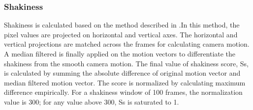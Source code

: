 \documentclass{IEEEtran}
\begin{document}
\subsubsection{Shakiness}
Shakiness is calculated based on the method described in \cite{web:4}.In this method, the pixel values are projected on horizontal and vertical axes. The horizontal and vertical projections are matched across the frames for calculating camera motion. A median filtered is finally applied on the motion vectors to differentiate the shakiness from the smooth camera motion. The final value of shakiness score, Ss, is calculated by summing the absolute difference of original motion vector and median filtered motion vector. The score is normalized by calculating maximum difference empirically. For a shakiness window of 100 frames, the normalization value is 300;
for any value above 300, Ss is saturated to 1.
\end{document}
